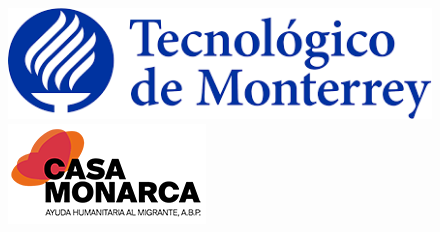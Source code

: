 \def\spa{40pt}

\thispagestyle{empty}

\begin{center}

\begin{figure}[htbp]
    \centering
    \begin{minipage}{0.4\textwidth}
        \centering
        \includegraphics[width=\textwidth]{Imagenes/logoTec.png}
    \end{minipage}
    \hfill
    \begin{minipage}{0.4\textwidth}
        \centering
        \includegraphics[width=\textwidth]{Imagenes/logoMonarca.png}
    \end{minipage}
\end{figure}


\end{center}
